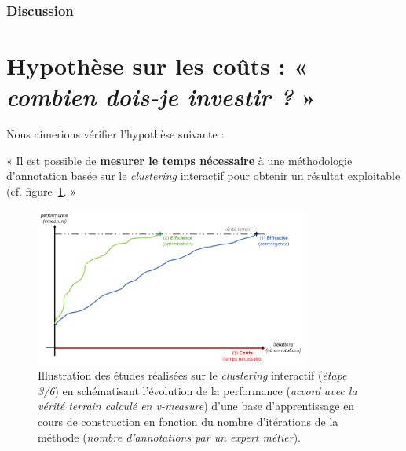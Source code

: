 			\subsubsection{Discussion}
	

    \section{Hypothèse sur les coûts : « \textit{combien dois-je investir ?} »}
	\label{section:4.3-HYPOTHESE-COUTS}
	
		Nous aimerions vérifier l'hypothèse suivante :

		\begin{tcolorbox}[
			title=\textbf{Hypothèse sur les coûts},
			colback=gray!20,
			colframe=gray!50!black!75,
			width=\linewidth
		]
			« Il est possible de \textbf{mesurer le temps nécessaire} à une méthodologie d'annotation basée sur le \textit{clustering} interactif pour obtenir un résultat exploitable (cf. figure~\ref{figure:HYPOTHESE-COUTS}. »
			
			
			\begin{figure}[H]
				\centering
				\includegraphics[width=0.8\textwidth]{figures/hypotheses-03-couts}
				\caption{Illustration des études réalisées sur le \textit{clustering} interactif (\textit{étape 3/6}) en schématisant l'évolution de la performance (\textit{accord avec la vérité terrain calculé en v-measure}) d'une base d'apprentissage en cours de construction en fonction du nombre d'itérations de la méthode (\textit{nombre d'annotations par un expert métier}).}
				\label{figure:HYPOTHESE-COUTS}
			\end{figure}

		\end{tcolorbox}
		
